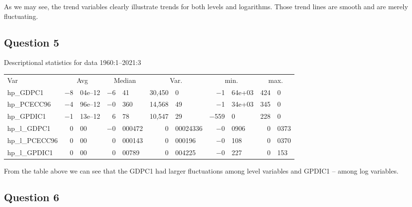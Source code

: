\documentclass[11pt, oneside]{article}
\begin{document}
As we may see, the trend variables clearly illustrate trends for both levels and logarithms. Those trend lines are smooth and are merely fluctuating.

\subsection*{Question 5}
\begin{center}
Descriptional statistics for data 1960:1--2021:3\\
	\vspace{8pt}
	\begin{tabular}{lr@{.}lr@{.}lr@{.}lr@{.}lr@{.}l}
		Var & \multicolumn{2}{c}{Avg}
		& \multicolumn{2}{c}{Median}
		& \multicolumn{2}{c}{Var.}
		& \multicolumn{2}{c}{min.}
		& \multicolumn{2}{c}{max.} \\[1ex]
		hp\_GDPC1 & $-$8&04\textrm{e--12} & $-$6&41 & 30,450& 0& $-$1&64\textrm{e+03} & 424&0\\
		hp\_PCECC96 & $-$4&96\textrm{e--12} & $-$0&360 & 14,568&49 & $-$1&34\textrm{e+03} & 345&0\\
		hp\_GPDIC1 & $-$1&13\textrm{e--12} & 6&78 & 10,547&29 & $-$559&0 & 228&0\\
		hp\_l\_GDPC1 & 0&00 & $-$0&000472 & 0&00024336 & $-$0&0906 & 0&0373\\
		hp\_l\_PCECC96 & 0&00 & 0&000143 & 0&000196 & $-$0&108 & 0&0370\\
		hp\_l\_GPDIC1 & 0&00 & 0&00789 & 0&004225 & $-$0&227 & 0&153\\
	\end{tabular}
\end{center}

From the table above we can see that the GDPC1 had larger fluctuations among level variables and GPDIC1 -- among log variables.


\subsection*{Question 6}
\end{document}
